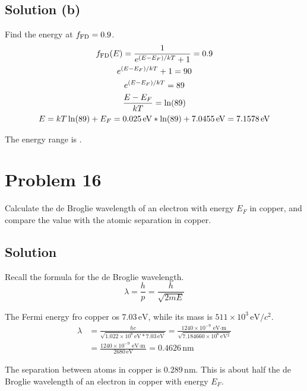 \documentclass[12pt]{article}
\newcommand{\e}[1]{e^{#1}}
\newcommand{\E}[1]{\times 10^{#1}}
\begin{document}
    \subsection{Solution (b)}
        Find the energy at $f_{\rm FD} = 0.9$.
        \begin{gather}
            f_{\rm FD}(E) = \frac{1}{\e{(E - E_F)/kT} + 1} = 0.9\\
            \e{(E - E_F)/kT} + 1 = 90\\
            \e{(E - E_F)/kT} = 89\\
            \frac{E - E_F}{kT} = \ln(89)\\
            E   =   kT \ln(89) + E_F
                =   0.025\,\unit{\eV} * \ln(89) + 7.0455\,\unit{\eV}
                =   7.1578\,\unit{\eV}
        \end{gather}

        The energy range is .
    \pagebreak

\section{Problem 16}
    Calculate the de Broglie wavelength of an electron with energy $E_F$ in copper, and compare the value with the atomic separation in copper.

    \subsection{Solution}
        Recall the formula for the de Broglie wavelength.
        \begin{equation}
            \lambda = \frac{h}{p} = \frac{h}{\sqrt{2mE}}
        \end{equation}

        The Fermi energy fro copper os $7.03\,\unit{\eV}$, while its mass is $511\E{3}\,\unit{\eV/}c^2$.
        \begin{align}
            \lambda &=  \frac{hc}{\sqrt{1.022\E{6}\,\unit{\eV}*7.03\,\unit{\eV}}}
                =   \frac{1240\E{-9}\,\unit{\eV\cdot\meter}}{\sqrt{7.184660\E{6}\,\unit{\eV^2}}}\\
                &=  \frac{1240\E{-9}\,\unit{\eV\cdot\meter}}{2680\,\unit{\eV}}
                =   \boxed{0.4626\,\unit{\nano\meter}}
        \end{align}

        The separation between atoms in copper is $0.289\,\unit{\nano\meter}$.
        This is about half the de Broglie wavelength of an electron in copper with energy $E_F$.
    \pagebreak
\end{document}
